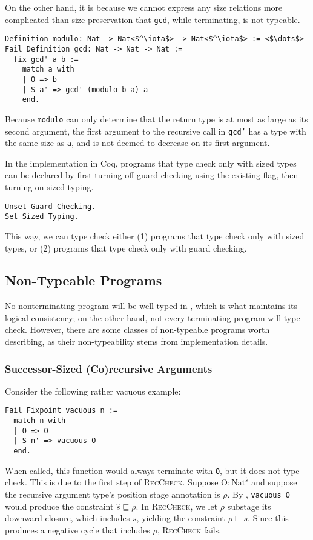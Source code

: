 \documentclass[nonacm,screen,10pt]{acmart}
\begin{document}
On the other hand, it is because we cannot express any size relations more complicated than size-preservation that \texttt{gcd}, while terminating, is not typeable.

\begin{verbatim}
Definition modulo: Nat -> Nat<$^\iota$> -> Nat<$^\iota$> := <$\dots$>
Fail Definition gcd: Nat -> Nat -> Nat :=
  fix gcd' a b :=
    match a with
    | O => b
    | S a' => gcd' (modulo b a) a
    end.
\end{verbatim}

Because \texttt{modulo} can only determine that the return type is at most as large as its second argument, the first argument to the recursive call in \texttt{gcd'} has a type with the same size as \texttt{a}, and is not deemed to decrease on its first argument.

In the implementation in Coq, programs that type check only with sized types can be declared by first turning off guard checking using the existing flag, then turning on sized typing.

\begin{verbatim}
Unset Guard Checking.
Set Sized Typing.
\end{verbatim}

This way, we can type check either (1) programs that type check only with sized types, or (2) programs that type check only with guard checking.

\subsection{Non-Typeable Programs}
No nonterminating program will be well-typed in \lang, which is what maintains its logical consistency; on the other hand, not every terminating program will type check. However, there are some classes of non-typeable programs worth describing, as their non-typeability stems from implementation details.

\subsubsection{Successor-Sized (Co)recursive Arguments}
Consider the following rather vacuous example:

\begin{verbatim}
Fail Fixpoint vacuous n :=
  match n with
  | O => O
  | S n' => vacuous O
  end.
\end{verbatim}

When called, this function would always terminate with \texttt{O}, but it does not type check. This is due to the first step of \textsc{RecCheck}. Suppose $\text{O}: \text{Nat}^{\hat{s}}$ and suppose the recursive argument type's position stage annotation is $\rho$. By , \texttt{vacuous O} would produce the constraint $\hat{s} \sqsubseteq \rho$. In \textsc{RecCheck}, we let $\rho$ substage its downward closure, which includes $s$, yielding the constraint $\rho \sqsubseteq s$. Since this produces a negative cycle that includes $\rho$, \textsc{RecCheck} fails.
\end{document}
